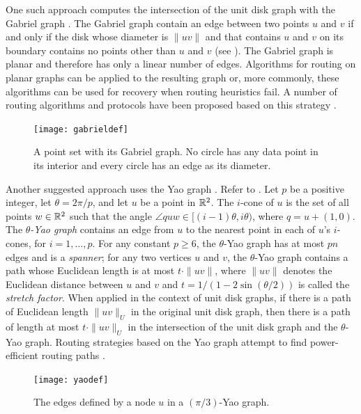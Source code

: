 \documentclass[lotsofwhite,charterfonts]{patmorin}
\begin{document}
One such approach computes the intersection of the unit disk graph with
the Gabriel graph \cite{gs69}.  The Gabriel graph contain an edge between
two points $u$ and $v$ if and only if the disk whose diameter is $\|uv\|$
and that contains $u$ and $v$ on its boundary contains no points other
than $u$ and $v$ (see ).  The Gabriel graph is planar
and therefore has only a linear number of edges.  Algorithms for routing
on planar graphs can be applied to the resulting graph or, more commonly,
these algorithms can be used for recovery when routing heuristics fail.
A number of routing algorithms and protocols have been proposed based
on this strategy \cite{bfno03,bmsu01,kk00}.

\begin{figure}
\begin{center}{\texttt{[image: gabrieldef]}}\end{center}
\caption{A point set with its Gabriel graph. No circle has
any data point in its interior and every circle has an edge
as its diameter.}
\end{figure}

Another suggested approach uses the Yao graph \cite{y82}. Refer to
. Let $p$ be a positive integer, let $\theta=2\pi/p$,
and let $u$ be a point in $\mathbb{R}^2$.  The $i$-cone of $u$ is the
set of all points $w\in\mathbb{R}^2$ such that the angle $\angle quw \in
[(i-1)\theta,i\theta)$, where $q = u+(1,0)$.  The \emph{$\theta$-Yao
graph} contains an edge from $u$ to the nearest point in each of
$u$'s $i$-cones, for $i=1,\ldots,p$.  For any constant $p\ge 6$, the
$\theta$-Yao graph has at most $pn$ edges and is a \emph{spanner}; for
any two vertices $u$ and $v$, the $\theta$-Yao graph contains a path
whose Euclidean length is at most $t\cdot\|uv\|$, where $\|uv\|$ denotes
the Euclidean distance between $u$ and $v$ and $t=1/(1-2\sin(\theta/2))$
is called the \emph{stretch factor}.  When applied in the context of
unit disk graphs, if there is a path of Euclidean length $\|uv\|_U$ in
the original unit disk graph, then there is a path of length at most
$t\cdot\|uv\|_U$ in the intersection of the unit disk graph and the
$\theta$-Yao graph.  Routing strategies based on the Yao graph attempt
to find power-efficient routing paths \cite{glsv02,lwy01,wlbw01,svz07}.

\begin{figure}
\begin{center}{\texttt{[image: yaodef]}}\end{center}
\caption{The edges defined by a node $u$ in a $(\pi/3)$-Yao graph.}
\end{figure}
\end{document}
